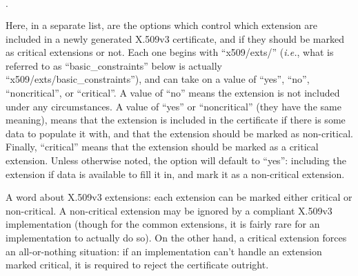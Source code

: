 \documentclass{article}
\newcommand{\ie}[0]{\emph{i.e.}}
\begin{document}
\begin{list}{$\cdot$}
  \item {}

  \item {}

  \item {}

  \item {}

  \item {}
\end{list}

Here, in a separate list, are the options which control which extension are
included in a newly generated X.509v3 certificate, and if they should be marked
as critical extensions or not. Each one begins with ``x509/exts/'' (\ie, what is
referred to as ``basic\_constraints'' below is actually
``x509/exts/basic\_constraints''), and can take on a value of ``yes'', ``no'',
``noncritical'', or ``critical''. A value of ``no'' means the extension is not
included under any circumstances. A value of ``yes'' or ``noncritical'' (they
have the same meaning), means that the extension is included in the certificate
if there is some data to populate it with, and that the extension should be
marked as non-critical. Finally, ``critical'' means that the extension should
be marked as a critical extension. Unless otherwise noted, the option will
default to ``yes'': including the extension if data is available to fill it in,
and mark it as a non-critical extension.

A word about X.509v3 extensions: each extension can be marked either critical
or non-critical. A non-critical extension may be ignored by a compliant X.509v3
implementation (though for the common extensions, it is fairly rare for an
implementation to actually do so). On the other hand, a critical extension
forces an all-or-nothing situation: if an implementation can't handle an
extension marked critical, it is required to reject the certificate outright.
\end{document}

